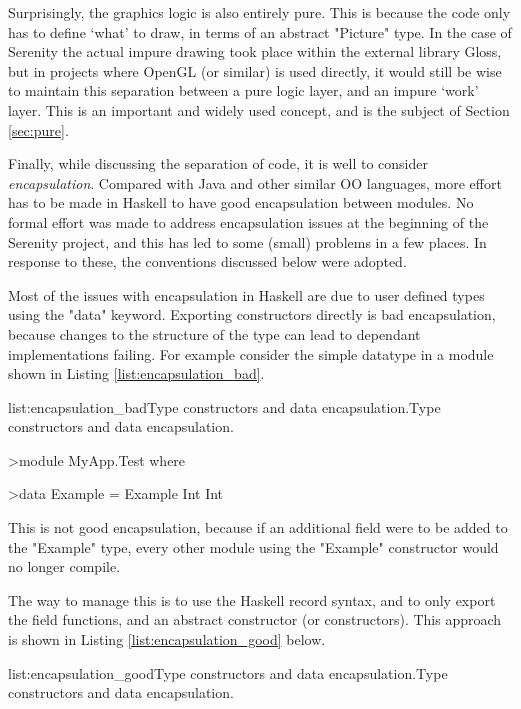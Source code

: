 Surprisingly, the graphics logic is also entirely pure. This is because the code only has to define `what' to draw, in terms of an abstract "Picture" type. In the case of Serenity the actual impure drawing took place within the external library Gloss, but in projects where OpenGL (or similar) is used directly, it would still be wise to maintain this separation between a pure logic layer, and an impure `work' layer. This is an important and widely used concept, and is the subject of Section \ref{sec:pure}.

Finally, while discussing the separation of code, it is well to consider \emph{encapsulation}. Compared with Java and other similar OO languages, more effort has to be made in Haskell to have good encapsulation between modules. No formal effort was made to address encapsulation issues at the beginning of the Serenity project, and this has led to some (small) problems in a few places. In response to these, the conventions discussed below were adopted.

Most of the issues with encapsulation in Haskell are due to user defined types using the "data" keyword. Exporting constructors directly is bad encapsulation, because changes to the structure of the type can lead to dependant implementations failing. For example consider the simple datatype in a module shown in Listing \ref{list:encapsulation_bad}.

\vspace{-0.5em}
\begin{listing}{list:encapsulation_bad}{Type constructors and data encapsulation.}{Type constructors and data encapsulation.}{}
\end{listing}\vspace{-1.5em}

\begin{haskell}
>module MyApp.Test where

>data Example = Example Int Int

\end{haskell}
\noindent
This is not good encapsulation, because if an additional field were to be added to the "Example" type, every other module using the "Example" constructor would no longer compile. 

The way to manage this is to use the Haskell record syntax, and to only export the field functions, and an abstract constructor (or constructors). This approach is shown in Listing \ref{list:encapsulation_good} below.

\vspace{-0.5em}
\begin{listing}{list:encapsulation_good}{Type constructors and data encapsulation.}{Type constructors and data encapsulation.}{}
\end{listing}\vspace{-1.5em}

